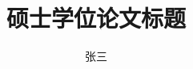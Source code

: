 \documentclass[degree=master, academic=true]{nwputhesis}
\title{硕士学位论文标题}{Master Thesis Title}
\author{张三}{San Zhang}
\begin{document}
\START
\showoutput

\maketitle

\clearpage
\OMIT
\end{document}
